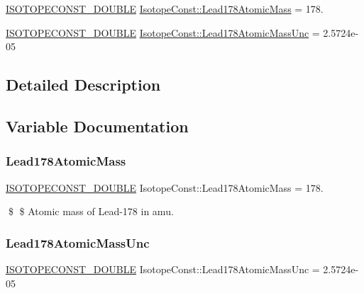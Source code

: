 \begin{DoxyCompactItemize}
\item 
\mbox{\hyperlink{group___isotope_const-_macros_ga8f45a7272ce02c0b4c65c44636ed719a}{I\+S\+O\+T\+O\+P\+E\+C\+O\+N\+S\+T\+\_\+\+D\+O\+U\+B\+LE}} \mbox{\hyperlink{group___isotope_const-_lead-_pb178_ga990834c67bd195146672129b23478dfa}{Isotope\+Const\+::\+Lead178\+Atomic\+Mass}} = 178.
\item 
\mbox{\hyperlink{group___isotope_const-_macros_ga8f45a7272ce02c0b4c65c44636ed719a}{I\+S\+O\+T\+O\+P\+E\+C\+O\+N\+S\+T\+\_\+\+D\+O\+U\+B\+LE}} \mbox{\hyperlink{group___isotope_const-_lead-_pb178_gaab8c22b4800fe127e42a9cbf14582011}{Isotope\+Const\+::\+Lead178\+Atomic\+Mass\+Unc}} = 2.\+5724e-\/05
\end{DoxyCompactItemize}


\subsection{Detailed Description}


\subsection{Variable Documentation}
\mbox{\label{group___isotope_const-_lead-_pb178_ga990834c67bd195146672129b23478dfa}} 
\subsubsection{\texorpdfstring{Lead178\+Atomic\+Mass}{Lead178AtomicMass}}
{\footnotesize\ttfamily \mbox{\hyperlink{group___isotope_const-_macros_ga8f45a7272ce02c0b4c65c44636ed719a}{I\+S\+O\+T\+O\+P\+E\+C\+O\+N\+S\+T\+\_\+\+D\+O\+U\+B\+LE}} Isotope\+Const\+::\+Lead178\+Atomic\+Mass = 178.}

\$ \$ Atomic mass of Lead-\/178 in amu. \mbox{\label{group___isotope_const-_lead-_pb178_gaab8c22b4800fe127e42a9cbf14582011}} 
\subsubsection{\texorpdfstring{Lead178\+Atomic\+Mass\+Unc}{Lead178AtomicMassUnc}}
{\footnotesize\ttfamily \mbox{\hyperlink{group___isotope_const-_macros_ga8f45a7272ce02c0b4c65c44636ed719a}{I\+S\+O\+T\+O\+P\+E\+C\+O\+N\+S\+T\+\_\+\+D\+O\+U\+B\+LE}} Isotope\+Const\+::\+Lead178\+Atomic\+Mass\+Unc = 2.\+5724e-\/05}

